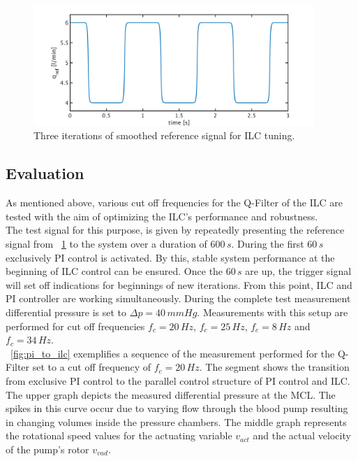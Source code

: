 \begin{figure}[ht]
  \centering
  \includegraphics[width=0.95\textwidth]{images/chapt_5/ILC/ref_signal_ILC3.pdf}
  \caption[Smoothed reference signal for ILC tuning.]{Three iterations of smoothed reference signal for ILC tuning.}
  \label{fig:ref_signal_ILC3}
\end{figure}
\subsection{Evaluation}
As mentioned above, various cut off frequencies for the Q-Filter of the ILC are tested with the aim of optimizing the ILC's performance and robustness.  \\The test signal for this purpose, is given by repeatedly presenting the reference signal from \figurename~\ref{fig:ref_signal_ILC3} to the system over a duration of $600\,s$. During the first $60\,s$ exclusively PI control is activated. By this, stable system performance at the beginning of ILC control can be ensured. Once the $60\,s$ are up, the trigger signal will set off indications for beginnings of new iterations. From this point, ILC and PI controller are working simultaneously. During the complete test measurement differential pressure is set to $\Delta{p}=40\,mmHg$. Measurements with this setup are performed for cut off frequencies $f_{c}=20\,Hz$, $f_{c}=25\,Hz$, $f_{c}=8\,Hz$ and $f_{c}=34\,Hz$.
\\\figurename~\ref{fig:pi_to_ilc} exemplifies a sequence of the measurement performed for the Q-Filter set to a cut off frequency of $f_c=20\,Hz$. The segment shows the transition from exclusive PI control to the parallel control structure of PI control and ILC. The upper graph depicts the measured differential pressure at the MCL. The spikes in this curve occur due to varying flow through the blood pump resulting in changing volumes inside the pressure chambers. The middle graph represents the rotational speed values for the actuating variable $v_{act}$ and the actual velocity of the pump's rotor $v_{vad}$.


